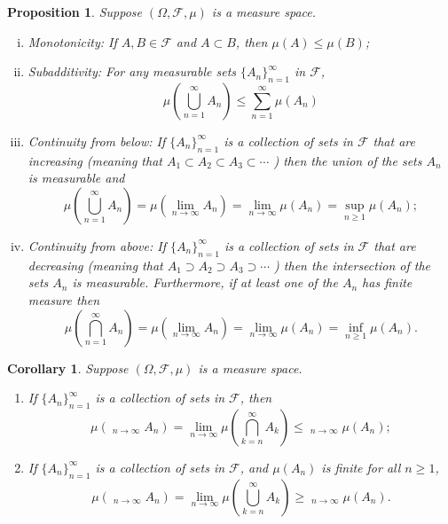 \documentclass{report}
\newtheorem{corollary}{Corollary}[section]
\newtheorem{proposition}{Proposition}[section]
\theoremstyle{nonumberplain}
\DeclareMathOperator*\lowlim{\underline{lim}}
\DeclareMathOperator*\uplim{\overline{lim}}
\begin{document}
\begin{proposition}
	Suppose $(\Omega,\mathcal{F},\mu)$ is a measure space. 
	\begin{enumerate}[(i)]
		\item Monotonicity: If $A,B\in\mathcal{F}$ and $A\subset B$, then $\mu(A)\le \mu(B)$;
		\item Subadditivity: For any measurable sets $\{A_{n}\}_{n=1}^{\infty}$ in $\mathcal{F}$,
		$$
		\mu\left(\bigcup_{n=1}^{\infty} A_{n}\right) \leq \sum_{n=1}^{\infty} \mu\left(A_{n}\right)
		$$
		\item Continuity from below: If $\{A_{n}\}_{n=1}^{\infty}$ is a collection of sets in $\mathcal{F}$ that are increasing (meaning that $A_{1} \subset A_{2} \subset A_{3} \subset \cdots$ ) then the union of the sets $A_{n}$ is measurable and
		$$
		\mu\left(\bigcup_{n=1}^{\infty} A_{n}\right)=\mu\left(\lim_{n\to\infty} A_{n}\right)=\lim_{n \rightarrow \infty} \mu\left(A_{n}\right)=\sup_{n\geq 1} \mu\left(A_{n}\right);
		$$
		\item Continuity from above: If $\{A_{n}\}_{n=1}^{\infty}$ is a collection of sets in $\mathcal{F}$ that are decreasing (meaning that $A_{1} \supset A_{2} \supset A_{3} \supset \cdots$ ) then the intersection of the sets $A_{n}$ is measurable. Furthermore, if at least one of the $A_{n}$ has finite measure then
		$$
		\mu\left(\bigcap_{n=1}^{\infty} A_{n}\right)=\mu\left(\lim_{n\to\infty} A_{n}\right)=\lim_{n \rightarrow \infty} \mu\left(A_{n}\right)=\inf_{n \geq 1} \mu\left(A_{n}\right).
		$$
	\end{enumerate}
\end{proposition}

\begin{corollary}
	Suppose $(\Omega,\mathcal{F},\mu)$ is a measure space. 
	\begin{enumerate}
		\item If $\{A_{n}\}_{n=1}^{\infty}$ is a collection of sets in $\mathcal{F}$, then 
		$$
		\mu\left(\lowlim_{n\to\infty} A_{n}\right)=\lim_{n \rightarrow \infty} \mu\left(\bigcap_{k=n}^\infty A_{k}\right)\le \lowlim_{n\to\infty} \mu\left(A_{n}\right);
		$$
		\item If $\{A_{n}\}_{n=1}^{\infty}$ is a collection of sets in $\mathcal{F}$, and $\mu(A_{n})$ is finite for all $n\ge 1$,
		$$
		\mu\left(\uplim_{n\to\infty} A_{n}\right)=\lim_{n \rightarrow \infty} \mu\left(\bigcup_{k=n}^\infty A_{k}\right)\ge \uplim_{n\to\infty} \mu\left(A_{n}\right).
		$$
	\end{enumerate}
\end{corollary}
\end{document}
